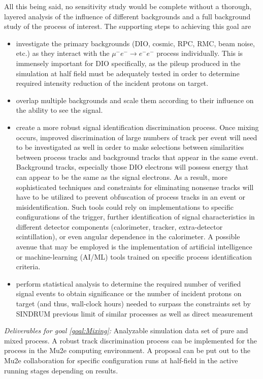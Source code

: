 \documentclass[12pt]{article}
\newcommand{\muEtoEE}{\mu^- e^- \to e^- e^-}
\begin{document}
\begin{enumerate}
All this being said, no sensitivity study would be complete without a thorough, layered analysis of the influence of different backgrounds and a full background study of the process of interest. The supporting steps to achieving this goal are
\begin{itemize}
\item investigate the primary backgrounds (DIO, cosmic, RPC, RMC, beam noise, etc.) as they interact with the $\muEtoEE$ process individually. This is immensely important for DIO specifically, as the pileup produced in the simulation at half field must be adequately tested in order to determine required intensity reduction of the incident protons on target.
\item overlap multiple backgrounds and scale them according to their influence on the ability to see the signal.
\item create a more robust signal identification discrimination process. Once mixing occurs, improved discrimination of large numbers of track per event will need to be investigated as well in order to make selections between similarities between process tracks and background tracks that appear in the same event. Background tracks, especially those DIO electrons will possess energy that can appear to be the same as the signal electrons. As a result, more sophisticated techniques and constraints for eliminating nonsense tracks will have to be utilized to prevent obfuscation of process tracks in an event or misidentification. Such tools could rely on implementations to specific configurations of the trigger, further identification of signal characteristics in different detector components (calorimeter, tracker, extra-detector scintillation), or even angular dependence in the calorimeter. A possible avenue that may be employed is the implementation of artificial intelligence or machine-learning (AI/ML) tools trained on specific process identification criteria.
\item perform statistical analysis to determine the required number of verified signal events to obtain significance or the number of incident protons on target (and thus, wall-clock hours) needed to surpass the constraints set by SINDRUM previous limit of similar processes as well as direct measurement
\end{itemize}
\textit{Deliverables for goal \ref{goal:Mixing}:} Analyzable simulation data set of pure and mixed process. A robust track discrimination process can be implemented for the process in the Mu2e computing environment. A proposal can be put out to the Mu2e collaboration for specific configuration runs at half-field in the active running stages depending on results.


\end{enumerate}
\end{document}
